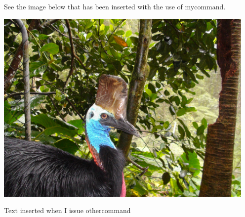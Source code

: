\documentclass[12pt]{article}
\newcommand{\mycommand}{\includegraphics[width=5in]{bird.jpg}}
\newcommand{\othercommand}{Text inserted when I issue othercommand}
\begin{document}
See the image below that has been inserted with the use of mycommand.

\mycommand

\othercommand
\end{document}
